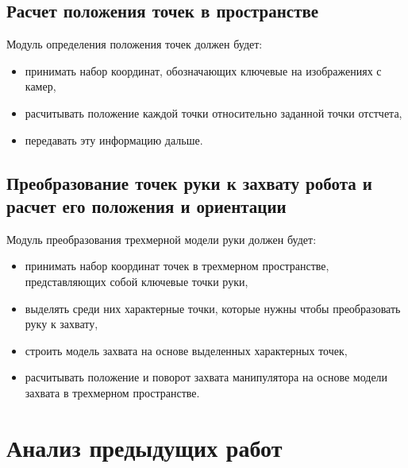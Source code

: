 \documentclass[12pt, a4paper]{article}
\begin{document}
\subsection{Расчет положения точек в пространстве}
Модуль определения положения точек должен будет:
\begin{itemize}
    \item принимать набор координат, обозначающих ключевые на изображениях с камер,
    \item расчитывать положение каждой точки относительно заданной точки отстчета,
    \item передавать эту информацию дальше.
\end{itemize}

\subsection{Преобразование точек руки к захвату робота и расчет его положения и ориентации}
Модуль преобразования трехмерной модели руки должен будет:
\begin{itemize}
    \item принимать набор координат точек в трехмерном пространстве, представляющих собой ключевые точки руки,
    \item выделять среди них характерные точки, которые нужны чтобы преобразовать руку к захвату,
    \item строить модель захвата на основе выделенных характерных точек,
    \item расчитывать положение и поворот захвата манипулятора на основе модели захвата в трехмерном пространстве.
\end{itemize}


\section{Анализ предыдущих работ}
\end{document}
